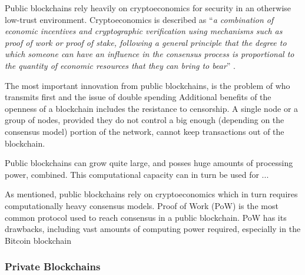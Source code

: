 Public blockchains rely heavily on cryptoeconomics for security in an otherwise low-trust environment. %
Cryptoeconomics is described as \enquote{\textit{a combination of economic incentives and cryptographic verification using mechanisms such as proof of work or proof of stake, following a general principle that the degree to which someone can have an influence in the consensus process is proportional to the quantity of economic resources that they can bring to bear}} \cite{Ethereum_pub_priv}. 

The most important innovation from public blockchains, is the problem of who transmits first and the issue of double spending %
Additional benefits of the openness of a blockchain includes the resistance to censorship. A single node or a group of nodes, provided they do not control a big enough (depending on the consensus model) portion of the network, cannot keep transactions out of the blockchain. 

Public blockchains can grow quite large, and posses huge amounts of processing power, combined. This computational capacity can in turn be used for ... %

As mentioned, public blockchains rely on cryptoeconomics which in turn requires computationally heavy consensus models. Proof of Work (PoW) is the most common protocol used to reach consensus in a public blockchain. %
PoW has its drawbacks, including vast amounts of computing power required, especially in the Bitcoin blockchain %





\subsubsection*{Private Blockchains}

